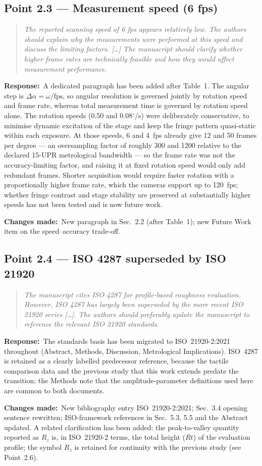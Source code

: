 \documentclass[11pt,a4paper]{article}
\newenvironment{reviewercomment}%
{\par\medskip\noindent\begin{quotation}\itshape\color{black!70}}%
{\end{quotation}\medskip}
\newcommand{\response}{\par\noindent\textbf{Response:}\ }
\newcommand{\changes}{\par\noindent\textbf{Changes made:}\ }
\begin{document}
\subsection*{Point 2.3 --- Measurement speed (6 fps)}
\begin{reviewercomment}
The reported scanning speed of 6 fps appears relatively low. The authors should explain why the measurements were performed at this speed and discuss the limiting factors. [\ldots] The manuscript should clarify whether higher frame rates are technically feasible and how they would affect measurement performance.
\end{reviewercomment}
\response A dedicated paragraph has been added after Table~1. The angular step is $\Delta\alpha=\omega/\mathrm{fps}$, so angular resolution is governed jointly by rotation speed and frame rate, whereas total measurement time is governed by rotation speed alone. The rotation speeds (0.50 and 0.08$^\circ$/s) were deliberately conservative, to minimise dynamic excitation of the stage and keep the fringe pattern quasi-static within each exposure. At those speeds, 6 and 4~fps already give 12 and 50 frames per degree --- an oversampling factor of roughly 300 and 1200 relative to the declared 15-UPR metrological bandwidth --- so the frame rate was not the accuracy-limiting factor, and raising it at fixed rotation speed would only add redundant frames. Shorter acquisition would require faster rotation with a proportionally higher frame rate, which the cameras support up to 120~fps; whether fringe contrast and stage stability are preserved at substantially higher speeds has not been tested and is now future work.
\changes New paragraph in Sec.~2.2 (after Table~1); new Future Work item on the speed--accuracy trade-off.

\subsection*{Point 2.4 --- ISO 4287 superseded by ISO 21920}
\begin{reviewercomment}
The manuscript cites ISO 4287 for profile-based roughness evaluation. However, ISO 4287 has largely been superseded by the more recent ISO 21920 series [\ldots]. The authors should preferably update the manuscript to reference the relevant ISO 21920 standards.
\end{reviewercomment}
\response The standards basis has been migrated to ISO~21920-2:2021 throughout (Abstract, Methods, Discussion, Metrological Implications). ISO~4287 is retained as a clearly labelled predecessor reference, because the tactile comparison data and the previous study that this work extends predate the transition; the Methods note that the amplitude-parameter definitions used here are common to both documents.
\changes New bibliography entry ISO~21920-2:2021; Sec.~3.4 opening sentence rewritten; ISO-framework references in Sec.~5.3, 5.5 and the Abstract updated. A related clarification has been added: the peak-to-valley quantity reported as $R_z$ is, in ISO~21920-2 terms, the total height ($Rt$) of the evaluation profile; the symbol $R_z$ is retained for continuity with the previous study (see Point~2.6).
\end{document}
